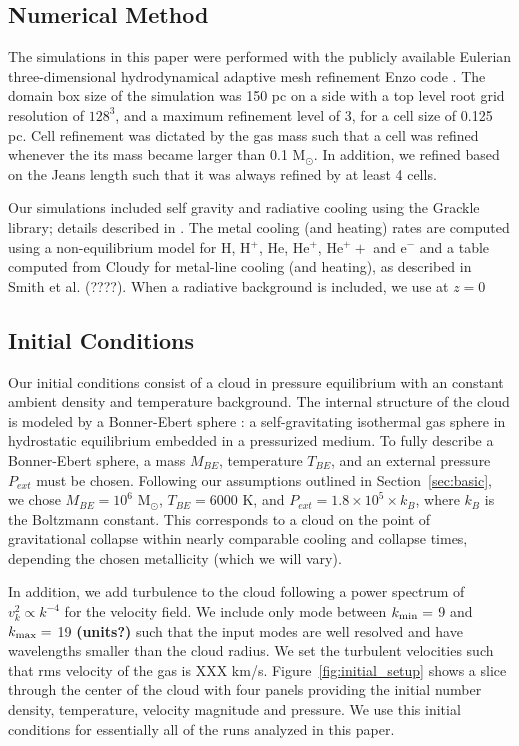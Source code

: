 \documentclass[useAMS,usenatbib]{mn2e}
\newcommand{\msun}{{M$_\odot$}}
\begin{document}
\subsection{Numerical Method}

The simulations in this paper were performed with the publicly available Eulerian three-dimensional
hydrodynamical adaptive mesh refinement Enzo code \citep{Bryan2013}. The domain
box size of the simulation was 150 pc on a side with a top level root grid resolution of $128^3$, and
a maximum refinement level of 3, for a cell size of 0.125 pc.  Cell refinement was dictated 
by the gas mass such that a cell was refined whenever the its mass became larger than 0.1 M$_\odot$.
In addition, we refined based on the Jeans length such that it was
always refined by at least 4 cells.

Our simulations included self gravity and radiative cooling using the
Grackle library; details described in \cite{Bryan2013}. The metal cooling (and
heating) rates are computed using a non-equilibrium model for H, H$^+$, He, He$^+$, He$^++$ and e$^-$
and a table computed from Cloudy for metal-line cooling (and heating), as described in Smith et al. (????).
When a radiative background is included, we use \cite{Haardt2012} at $z=$0

\subsection{Initial Conditions}
Our initial conditions consist of a cloud in pressure equilibrium with an
constant ambient density and temperature background. The internal structure of the
cloud is modeled by a Bonner-Ebert sphere \cite{Bonnor1956}: a self-gravitating
isothermal gas sphere in hydrostatic equilibrium embedded in a pressurized  
medium. To fully describe a Bonner-Ebert sphere, a mass $M_{BE}$, temperature
$T_{BE}$, and an external pressure $P_{ext}$ must be chosen. Following our
assumptions outlined in Section~\ref{sec:basic}, we chose
$M_{BE}=10^6$ \msun, $T_{BE}=6000$ K, and $P_{ext}=1.8\times10^5\times k_B$, 
where $k_B$ is the Boltzmann constant. This corresponds to a cloud on the point of
gravitational collapse within nearly comparable cooling and collapse times,
depending the chosen metallicity (which we will vary).

In addition, we add turbulence to the cloud following a power spectrum of
$v_k^2 \propto k^{-4}$ for the velocity field.  We include only mode between
$k_{\rm min}=$ 9 and $k_{\rm max} =$ 19 {\bf (units?)} such that the input modes are well resolved
and have wavelengths smaller than the cloud radius.  We set the turbulent velocities
such that rms velocity of the gas is XXX km/s. Figure~\ref{fig:initial_setup} shows 
a slice through the center of the cloud with four panels providing
the initial number density, temperature, velocity magnitude and pressure.  We use
this initial conditions for essentially all of the runs analyzed in this paper.
\end{document}
